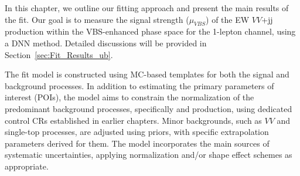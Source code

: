 \label{ch:stat_interpretation}

In this chapter, we outline our fitting approach and present the main results of the fit. 
Our goal is to measure the signal strength ($\mu_{VBS}$) of the EW $VV$+jj production within the VBS-enhanced phase space for the 1-lepton channel, 
using a DNN method. 
Detailed discussions will be provided in Section~\ref{sec:Fit_Results_ub}.

The fit model is constructed using MC-based templates for both the signal and background processes. In addition to estimating the primary parameters of interest (POIs), the model aims to constrain the normalization of the predominant background processes, specifically \Wjets and \ttbar production, using dedicated control CRs established in earlier chapters. Minor backgrounds, such as $VV$ and single-top processes, are adjusted using priors, with specific extrapolation parameters derived for them. The model incorporates the main sources of systematic uncertainties, applying normalization and/or shape effect schemes as appropriate. 



  
  
  

